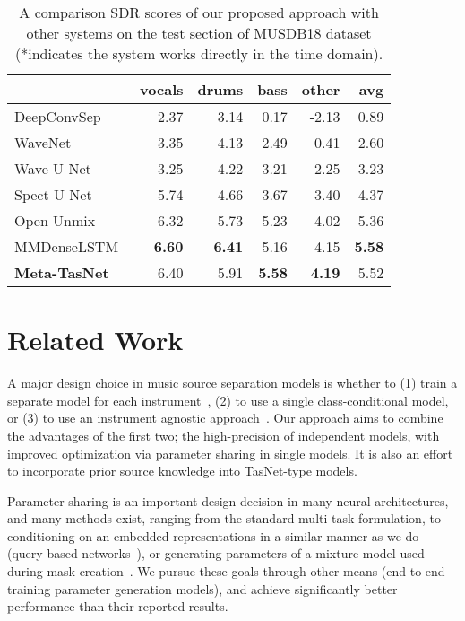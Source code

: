 \documentclass{article}
\begin{document}
\begin{table}[t]
\footnotesize
\begin{tabular}{l r r r r r}
\toprule
& \textbf{vocals} & \textbf{drums} & \textbf{bass} & \textbf{other} & \textbf{avg} \\
\midrule
DeepConvSep~\cite{chandna2017monoaural} & 2.37 & 3.14 & 0.17 & -2.13 & 0.89 \\
WaveNet~\cite{lluis2018end} & 3.35 & 4.13 & 2.49 & 0.41 & 2.60 \\
Wave-U-Net~\cite{stoller2018wave} & 3.25 & 4.22 & 3.21 & 2.25 & 3.23 \\
Spect U-Net~\cite{liu2018denoising} & 5.74 & 4.66 & 3.67 & 3.40 & 4.37 \\
Open Unmix~\cite{open-unmix} & 6.32 & 5.73 & 5.23 & 4.02 & 5.36 \\
MMDenseLSTM~\cite{takahashi2018mmdenselstm} & \bf{6.60} & \bf{6.41} & 5.16 & 4.15 & \bf{5.58} \\
\midrule
\textbf{Meta-TasNet} & 6.40 & 5.91 & \bf{5.58} & \bf{4.19} & 5.52 \\
\bottomrule
\end{tabular}
\caption{A comparison SDR scores of our proposed approach with other systems on the test section of MUSDB18 dataset (*indicates the system works directly in the time domain).} 
\label{table:results}
\end{table}
 \section{Related Work}

A major design choice in music source separation models is whether to (1) train a separate model for each instrument~\cite{open-unmix}, (2) to use a single class-conditional model, or (3) to use an instrument agnostic approach~\cite{recursive-tasnet}.  Our approach aims to combine the advantages of the first two; the high-precision of independent models, with improved optimization via parameter sharing in single models.  It is also an effort to incorporate prior source knowledge into TasNet-type models.

Parameter sharing is an important design decision in many neural architectures, and many methods exist, ranging from the standard multi-task formulation, to conditioning on an embedded representations in a similar manner as we do (query-based networks~\cite{query-source-sep}), or generating parameters of a mixture model used during mask creation~\cite{class-conditional-source-sep}.  We pursue these goals through other means (end-to-end training parameter generation models), and achieve significantly better performance than their reported results.
\end{document}
